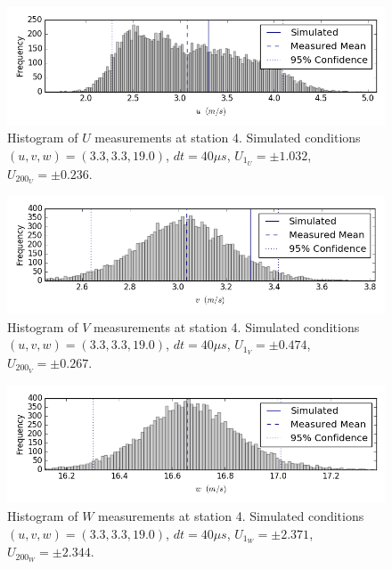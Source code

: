 \begin{figure}[H]
\centering
\includegraphics[width=6in]{figs/Ely_May28th04002/uncertainty_Ely_May28th04002_U}
\caption{Histogram of $U$ measurements at station 4. Simulated conditions 
$(u,v,w)=(3.3, 3.3, 19.0)$, $dt=40 \mu s$, $U_{1_{U}}=\pm 1.032$, 
$U_{200_{U}}=\pm 0.236$.}
\label{fig:uncertainty_Ely_May28th04002_U}
\end{figure}


\begin{figure}[H]
\centering
\includegraphics[width=6in]{figs/Ely_May28th04002/uncertainty_Ely_May28th04002_V}
\caption{Histogram of $V$ measurements at station 4. Simulated conditions 
$(u,v,w)=(3.3, 3.3, 19.0)$, $dt=40 \mu s$, $U_{1_{V}}=\pm 0.474$, 
$U_{200_{V}}=\pm 0.267$.}
\label{fig:uncertainty_Ely_May28th04002_V}
\end{figure}


\begin{figure}[H]
\centering
\includegraphics[width=6in]{figs/Ely_May28th04002/uncertainty_Ely_May28th04002_W}
\caption{Histogram of $W$ measurements at station 4. Simulated conditions 
$(u,v,w)=(3.3, 3.3, 19.0)$, $dt=40 \mu s$, $U_{1_{W}}=\pm 2.371$, 
$U_{200_{W}}=\pm 2.344$.}
\label{fig:uncertainty_Ely_May28th04002_W}
\end{figure}


